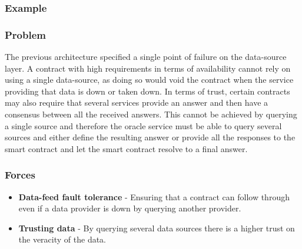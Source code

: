 \subsubsection{Example} 

\subsubsection{Problem}
The previous architecture specified a single point of failure on the data-source layer. A contract with high requirements in terms of availability cannot rely on using a single data-source, as doing so would void the contract when the service providing that data is down or taken down. In terms of trust, certain contracts may also require that several services provide an answer and then have a consensus between all the received answers. This cannot be achieved by querying a single source and therefore the oracle service must be able to query several sources and either define the resulting answer or provide all the responses to the smart contract and let the smart contract resolve to a final answer.

\subsubsection{Forces}
\begin{itemize}
\item \textbf{Data-feed fault tolerance} - Ensuring that a contract can follow through even if a data provider is down by querying another provider.
\item \textbf{Trusting data} - By querying several data sources there is a higher trust on the veracity of the data.
\end{itemize}


